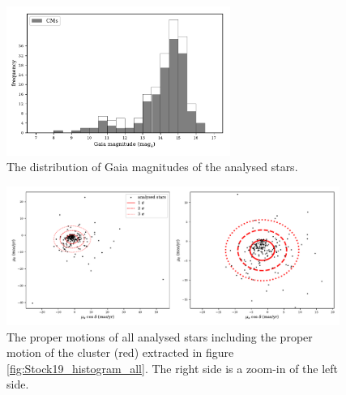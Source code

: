 \documentclass{article}
\begin{document}
\begin{figure}[H]
  \centering
    \includegraphics[trim={0 0.4cm 0 0.2cm},clip,width=0.65\textwidth]{Stock19_histogram_mags.pdf}
  \caption{The distribution of Gaia magnitudes of the analysed stars.}
  \label{fig:Stock19_histogram_mags}
\end{figure}

\begin{figure}[H]
  \centering
    \includegraphics[trim={0 0.5cm 0 0.5cm},clip,width=0.97\textwidth]{Stock19_pm_scatter_sigma.pdf}
  \caption{The proper motions of all analysed stars including the proper motion of the cluster (red) extracted in figure \ref{fig:Stock19_histogram_all}. The right side is a zoom-in of the left side.}
  \label{fig:Stock19_pm_scatter_sigma}
\end{figure}
\end{document}
